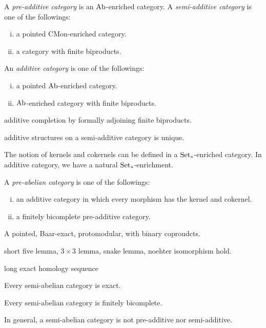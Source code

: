 \documentclass{../../large}
\newcommand{\CMon}{\mathrm{CMon}}
\begin{document}
\begin{prb}
A \emph{pre-additive category} is an $\mathrm{Ab}$-enriched category.
A \emph{semi-additive category} is one of the followings:
\begin{enumerate}[(i)]
\item a pointed $\CMon$-enriched category.
\item a category with finite biproducts.
\end{enumerate}
An \emph{additive category} is one of the followings:
\begin{enumerate}[(i)]
\item a pointed $\mathrm{Ab}$-enriched category.
\item $\mathrm{Ab}$-enriched category with finite biproducts.
\end{enumerate}
\begin{parts}
\item additive completion by formally adjoining finite biproducts.
\item additive structures on a semi-additive category is unique.
\end{parts}
\end{prb}

The notion of kernels and cokernels can be defined in a $\mathrm{Set}_*$-enriched category.
In additive category, we have a natural $\mathrm{Set}_*$-enrichment.


\begin{prb}
A \emph{pre-abelian category} is one of the followings:
\begin{enumerate}[(i)]
\item an additive category in which every morphism has the kernel and cokernel.
\item a finitely bicomplete pre-additive category.
\end{enumerate}
\begin{parts}
\item 
\end{parts}
\end{prb}

\begin{prb}
A pointed, Baar-exact, protomodular, with binary coproudcts.
\begin{parts}
\item short five lemma, $3\times3$ lemma, snake lemma, noehter isomorphism hold.
\item long exact homology sequence
\item Every semi-abelian category is exact.
\item Every semi-abelian category is finitely bicomplete.
\item In general, a semi-abelian category is not pre-additive nor semi-additive.
\end{parts}
\end{prb}
\end{document}
